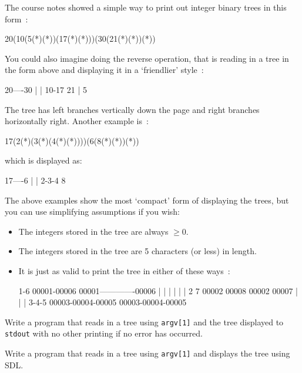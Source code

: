 
The course notes showed a simple way to print out integer binary trees in
this form~:
\begin{terminaloutput}
20(10(5(*)(*))(17(*)(*)))(30(21(*)(*))(*))
\end{terminaloutput}

You could also imagine doing the reverse operation, that is reading in a tree in the form above and 
displaying it in a `friendlier' style~:
\begin{terminaloutput}

20----30
|     |
10-17 21
|
5

\end{terminaloutput}
The tree has left branches vertically down the page and right branches
horizontally right.
Another example is~:
\begin{terminaloutput}
17(2(*)(3(*)(4(*)(*))))(6(8(*)(*))(*))
\end{terminaloutput}
which is displayed as:
\begin{terminaloutput}
17----6
|     |
2-3-4 8

\end{terminaloutput}

The above examples show the most `compact' form of displaying the
trees, but you can use simplifying assumptions if you wish: 
\begin{itemize}
\item The integers stored in the tree are always $\geq 0$.
\item The integers stored in the tree are 5 characters (or less) in length.
\item It is just as valid to print the tree in either of these ways~:
\begin{terminaloutput}
1-6       00001-00006          00001-------------00006
| |         |     |              |                 |
2 7       00002 00008          00002             00007
|           |                    |                 
3-4-5     00003-00004-00005    00003-00004-00005                 
\end{terminaloutput}
\end{itemize}

\begin{exercise}
Write a program that reads in a tree using \verb^argv[1]^
and the tree displayed to \verb^stdout^ with no other printing if no error
has occurred.
\end{exercise}

\begin{exercise}
Write a program that reads in a tree using \verb^argv[1]^
and displays the tree using SDL.
\end{exercise}
